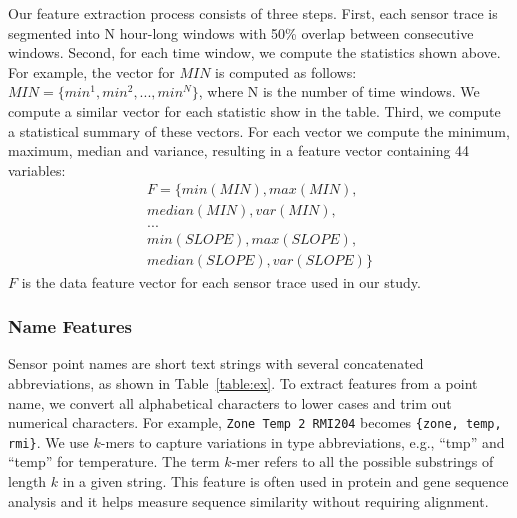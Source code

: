 Our feature extraction process consists of three steps.
First, each sensor trace is segmented into N hour-long windows with 50\% overlap between consecutive windows. Second, for each time window, we compute the statistics shown above.
For example, the vector for $MIN$ is computed as follows:
$MIN = \{min^{1}, min^{2}, ..., min^{N}\}$, where N is the number of time windows. We compute a similar vector for each statistic show in the table.
Third, we compute a statistical summary of these vectors. For each vector we compute the minimum, maximum, median and variance, resulting in a feature
vector containing 44 variables:
\begin{displaymath}
\begin{split}
F = \{min(MIN), max(MIN), \\
median(MIN), var(MIN),\\
...\\
min(SLOPE), max(SLOPE), \\
median(SLOPE), var(SLOPE)\}
\end{split}
\end{displaymath}
$F$ is the data feature vector for each sensor trace used in our study.


\subsubsection{Name Features}
Sensor point names are short text strings with several concatenated abbreviations, as shown in Table~\ref{table:ex}.
To extract features from a point name, we convert all alphabetical characters to lower cases and trim out numerical characters.
For example, \texttt{Zone Temp 2 RMI204} becomes \texttt{\{zone, temp, rmi\}}.
We use $k$-mers \cite{leslie2004mismatch} to capture variations in type abbreviations, e.g., ``tmp'' and ``temp'' for temperature.
The term $k$-mer refers to all the possible substrings of length $k$ in a given string. This feature is often used in protein and gene sequence analysis and
it helps measure sequence similarity without requiring alignment.


